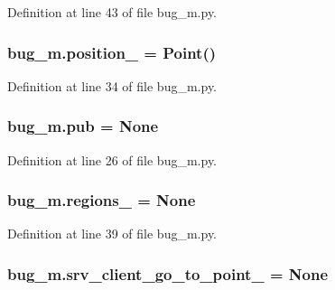 Definition at line 43 of file bug\+\_\+m.\+py.

\subsubsection[{\texorpdfstring{position\+\_\+}{position_}}]{\setlength{\rightskip}{0pt plus 5cm}bug\+\_\+m.\+position\+\_\+ = Point()}\hypertarget{namespacebug__m_ab108d02234aa3ec58605b9f6980ec090}{}\label{namespacebug__m_ab108d02234aa3ec58605b9f6980ec090}


Definition at line 34 of file bug\+\_\+m.\+py.

\subsubsection[{\texorpdfstring{pub}{pub}}]{\setlength{\rightskip}{0pt plus 5cm}bug\+\_\+m.\+pub = None}\hypertarget{namespacebug__m_adc14150838edf40c8028207cd6bb2082}{}\label{namespacebug__m_adc14150838edf40c8028207cd6bb2082}


Definition at line 26 of file bug\+\_\+m.\+py.

\subsubsection[{\texorpdfstring{regions\+\_\+}{regions_}}]{\setlength{\rightskip}{0pt plus 5cm}bug\+\_\+m.\+regions\+\_\+ = None}\hypertarget{namespacebug__m_ac9d4d95c034fca5a2b5d08ea845bbfcb}{}\label{namespacebug__m_ac9d4d95c034fca5a2b5d08ea845bbfcb}


Definition at line 39 of file bug\+\_\+m.\+py.

\subsubsection[{\texorpdfstring{srv\+\_\+client\+\_\+go\+\_\+to\+\_\+point\+\_\+}{srv_client_go_to_point_}}]{\setlength{\rightskip}{0pt plus 5cm}bug\+\_\+m.\+srv\+\_\+client\+\_\+go\+\_\+to\+\_\+point\+\_\+ = None}\hypertarget{namespacebug__m_abd32bbd25b55f71e56505e72ba56c2f6}{}\label{namespacebug__m_abd32bbd25b55f71e56505e72ba56c2f6}


